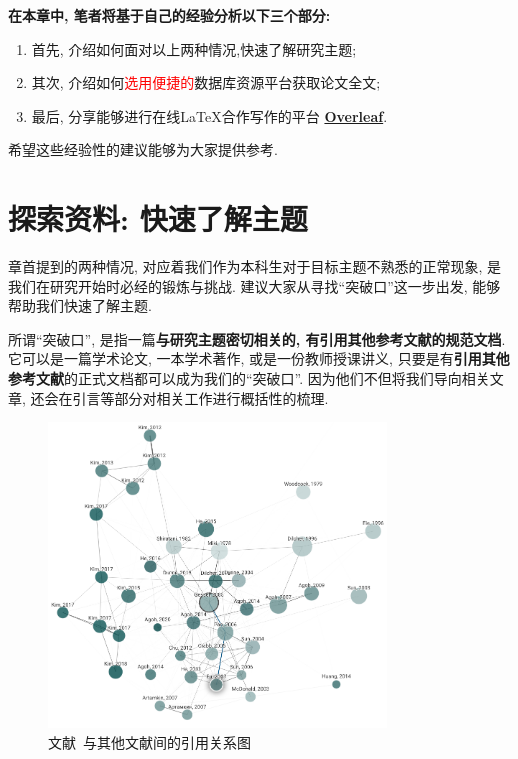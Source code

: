 \documentclass{formatBook}
\newcommand{\XG}[1]{\textcolor{red}{#1}}
\begin{document}
\textbf{在本章中, 笔者将基于自己的经验分析以下三个部分:}
\begin{enumerate}
    \item 首先, 介绍如何面对以上两种情况,快速了解研究主题;
    \item 其次, 介绍如何\XG{选用便捷的}数据库资源平台获取论文全文;
    \item 最后, 分享能够进行在线\LaTeX 合作写作的平台 \textbf{\href{https://www.overleaf.com/}{Overleaf}}.
\end{enumerate}

希望这些经验性的建议能够为大家提供参考.

\section{探索资料: 快速了解主题}
章首提到的两种情况, 对应着我们作为本科生对于目标主题不熟悉的正常现象, 是我们在研究开始时必经的锻炼与挑战. 建议大家从寻找``突破口''这一步出发, 能够帮助我们快速了解主题.

所谓``突破口'', 是指一篇\textbf{与研究主题密切相关的, 有引用其他参考文献的规范文档}. 它可以是一篇学术论文, 一本学术著作, 或是一份教师授课讲义, 只要是有\textbf{引用其他参考文献}的正式文档都可以成为我们的``突破口''. 因为他们不但将我们导向相关文章, 还会在引言等部分对相关工作进行概括性的梳理.

\begin{figure}[H]
    \centering
    \includegraphics[width=0.8\textwidth]{figure/graph.png}
    \caption{文献~\cite{GesselMiki2005}与其他文献间的引用关系图}
    \label{fig:mikiGrapg}
\end{figure}
\end{document}
